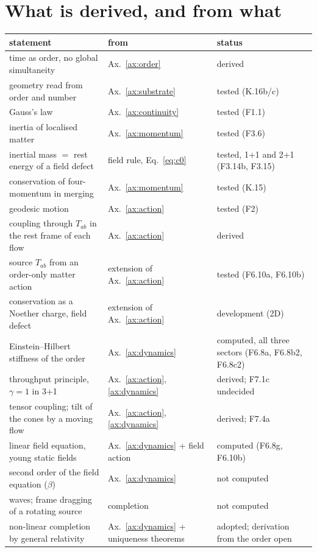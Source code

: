 \section{What is derived, and from what}\label{sec:ax-summary}

\begin{center}
\begin{tabularx}{\linewidth}{>{\raggedright\arraybackslash}X>{\raggedright\arraybackslash}p{2.6cm}>{\raggedright\arraybackslash}p{4.8cm}}
\toprule
statement & from & status\\
\midrule
time as order, no global simultaneity & Ax.~\ref{ax:order} & derived\\
geometry read from order and number & Ax.~\ref{ax:substrate} & tested (K.16b/c)\\
Gauss's law & Ax.~\ref{ax:continuity} & tested (F1.1)\\
inertia of localised matter & Ax.~\ref{ax:momentum} & tested (F3.6)\\
inertial mass $=$ rest energy of a field defect & field rule, Eq.~\eqref{eq:c0} & tested, 1+1 and 2+1 (F3.14b, F3.15)\\
conservation of four-momentum in merging & Ax.~\ref{ax:momentum} & tested (K.15)\\
geodesic motion & Ax.~\ref{ax:action} & tested (F2)\\
coupling through $T_{ab}$ in the rest frame of each flow & Ax.~\ref{ax:action} & derived\\
source $T_{ab}$ from an order-only matter action & extension of Ax.~\ref{ax:action} & tested (F6.10a, F6.10b)\\
conservation as a Noether charge, field defect & extension of Ax.~\ref{ax:action} & development (2D)\\
Einstein--Hilbert stiffness of the order & Ax.~\ref{ax:dynamics} & computed, all three sectors (F6.8a, F6.8b2, F6.8c2)\\
throughput principle, $\gamma=1$ in 3+1 & Ax.~\ref{ax:action}, \ref{ax:dynamics} & derived; F7.1c undecided\\
tensor coupling; tilt of the cones by a moving flow & Ax.~\ref{ax:action}, \ref{ax:dynamics} & derived; F7.4a\\
linear field equation, young static fields & Ax.~\ref{ax:dynamics} + field action & computed (F6.8g, F6.10b)\\
second order of the field equation ($\beta$) & Ax.~\ref{ax:dynamics} & not computed\\
waves; frame dragging of a rotating source & completion & not computed\\
non-linear completion by general relativity & Ax.~\ref{ax:dynamics} + uniqueness theorems & adopted; derivation from the order open\\
\bottomrule
\end{tabularx}
\end{center}
